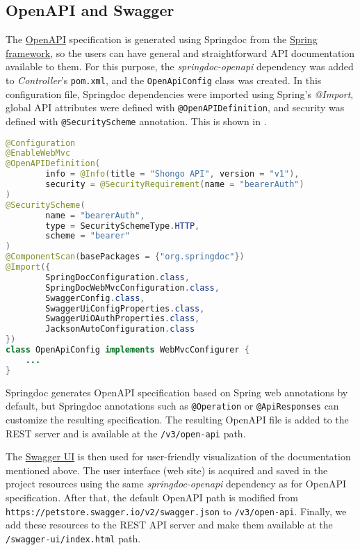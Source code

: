 \subsection{OpenAPI and Swagger}
The \hyperref[sec:openapi]{OpenAPI} specification is generated using Springdoc from the \hyperref[sec:spring]{Spring framework}, so the users can have general and straightforward API documentation available to them.
For this purpose, the \emph{springdoc-openapi} dependency was added to \emph{Controller}'s \texttt{pom.xml}, and the \texttt{OpenApiConfig} class was created. In this configuration file, Springdoc dependencies were imported using Spring's \emph{@Import}, global API attributes were defined with \texttt{@OpenAPIDefinition}, and security was defined with \texttt{@SecurityScheme} annotation.
This is shown in .
\begin{lstlisting}[language=Java, caption=OpenApiConfig.java, label=lst:openapi]
@Configuration
@EnableWebMvc
@OpenAPIDefinition(
        info = @Info(title = "Shongo API", version = "v1"),
        security = @SecurityRequirement(name = "bearerAuth")
)
@SecurityScheme(
        name = "bearerAuth",
        type = SecuritySchemeType.HTTP,
        scheme = "bearer"
)
@ComponentScan(basePackages = {"org.springdoc"})
@Import({
        SpringDocConfiguration.class,
        SpringDocWebMvcConfiguration.class,
        SwaggerConfig.class,
        SwaggerUiConfigProperties.class,
        SwaggerUiOAuthProperties.class,
        JacksonAutoConfiguration.class
})
class OpenApiConfig implements WebMvcConfigurer {
    ...
}
\end{lstlisting}
Springdoc generates OpenAPI specification based on Spring web annotations by default, but Springdoc annotations such as \texttt{@Operation} or \texttt{@ApiResponses} can customize the resulting specification.
The resulting OpenAPI file is added to the REST server and is available at the \texttt{/v3/open-api} path. \cite{springdoc}

The \hyperref[sec:swagger]{Swagger UI} is then used for user-friendly visualization of the documentation mentioned above.
The user interface (web site) is acquired and saved in the project resources using the same \emph{springdoc-openapi} dependency as for OpenAPI specification. After that, the default OpenAPI path is modified from \texttt{https://\-petstore.swagger.io\-/v2/swagger\-.json} to \texttt{/v3/open-api}. Finally, we add these resources to the REST API server and make them available at the  \texttt{/swagger-ui/index.html} path.

